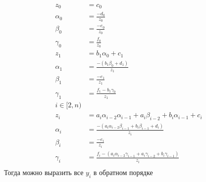 \documentclass[a4paper, fontsize=14pt]{article}
\begin{document}
\begin{equation*}
    \begin{aligned}
        z_0      & =c_0                                                                           \\
        \alpha_0 & =\frac{-d_0}{z_0}                                                              \\
        \beta_0  & =\frac{-e_0}{z_0}                                                              \\
        \gamma_0 & =\frac{f_0}{z_0}                                                               \\
        z_1      & =b_1\alpha_0+c_1                                                               \\
        \alpha_1 & =\frac{-(b_1\beta_0+d_1)}{z_1}                                                 \\
        \beta_1  & =\frac{-e_1}{z_1}                                                              \\
        \gamma_1 & =\frac{f_1-b_1\gamma_0}{z_1}                                                   \\
        i\in[2,n)                                                                                 \\
        z_i      & =a_i\alpha_{i-2}\alpha_{i-1}+a_i\beta_{i-2}+b_i\alpha_{i-1}+c_i                \\
        \alpha_i & =\frac{-(a_i\alpha_{i-2}\beta_{i-1}+b_i\beta_{i-1}+d_i)}{z_i}                  \\
        \beta_i  & =\frac{-e_i}{z_i}                                                              \\
        \gamma_i & =\frac{f_i-(a_i\alpha_{i-2}\gamma_{i-1}+a_i\gamma_{i-2}+b_i\gamma_{i-1})}{z_i} \\
    \end{aligned}
\end{equation*}
Тогда можно выразить все $y_i$ в обратном порядке
\end{document}
